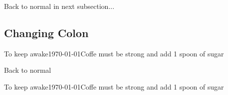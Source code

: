 \documentclass[12pt,a4paper]{article}
\begin{document}
Back to normal in next subsection...

\subsection{Changing Colon}

\trsetcolon{$\leftarrow$}
%
{To keep awake}{\today}{Coffe must be strong and add 1 spoon of sugar}

Back to normal

\trsettitlelabel{}
\trsetcolon{:}
%
{To keep awake}{\today}{Coffe must be strong and add 1 spoon of sugar}



\newpage
\setlength{\cfttasksnumwidth}{20pt}
\newpage
\listoftasks
\end{document}
